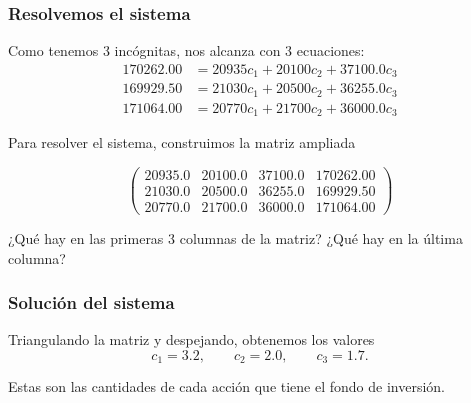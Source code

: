 \documentclass[aspectratio=169,12pt]{beamer}
\begin{document}

\begin{frame}
\frametitle{Resolvemos el sistema}

Como tenemos 3 incógnitas, nos alcanza con 3 ecuaciones:
\begin{align*}
170262.00	&= 20935	c_1 + 20100 c_2 + 37100.0 c_3 \\
169929.50	&= 21030	c_1 + 20500 c_2 + 36255.0 c_3 \\
171064.00	&= 20770	c_1 + 21700 c_2 + 36000.0 c_3
\end{align*}

Para resolver el sistema, construimos la matriz ampliada

$$ 
\left(\begin{array}{ccc|c}
20935.0	& 20100.0 & 37100.0 & 170262.00	 \\
21030.0	& 20500.0 & 36255.0 & 169929.50	 \\
20770.0	& 21700.0 & 36000.0 & 171064.00	
\end{array}\right) 
$$

\vspace{0.5cm}

¿Qué hay en las primeras 3 columnas de la matriz? ¿Qué hay en la última columna?

\end{frame}


\begin{frame}
\frametitle{Solución del sistema}

Triangulando la matriz y despejando, obtenemos los valores
$$
c_1 = 3.2, \quad \quad c_2 =  2.0, \quad \quad c_3 = 1.7.
$$

Estas son las cantidades de cada acción que tiene el fondo de inversión.

\end{frame}

\end{document}

